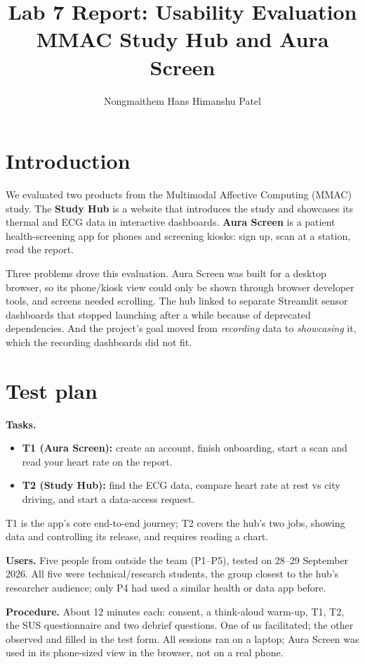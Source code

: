 \documentclass[10pt,a4paper,twocolumn]{article}
\title{\vspace{-1.2cm}\textbf{Lab 7 Report: Usability Evaluation}\\[2pt]
  \large MMAC Study Hub and Aura Screen}
\author{Nongmaithem Hans \quad Himanshu Patel}
\date{\vspace{-0.4cm}}
\begin{document}
\maketitle

\section{Introduction}
We evaluated two products from the Multimodal Affective Computing (MMAC) study.
The \textbf{Study Hub} is a website that introduces the study and showcases its
thermal and ECG data in interactive dashboards. \textbf{Aura Screen} is a patient
health-screening app for phones and screening kiosks: sign up, scan at a station,
read the report.

Three problems drove this evaluation. Aura Screen was built for a desktop browser,
so its phone/kiosk view could only be shown through browser developer tools, and
screens needed scrolling. The hub linked to separate Streamlit sensor dashboards
that stopped launching after a while because of deprecated dependencies. And the
project's goal moved from \emph{recording} data to \emph{showcasing} it, which the
recording dashboards did not fit.

\section{Test plan}
\textbf{Tasks.}
\begin{itemize}
  \item \textbf{T1 (Aura Screen):} create an account, finish onboarding,
    start a scan and read your heart rate on the report.
  \item \textbf{T2 (Study Hub):} find the ECG data, compare heart rate at rest
    vs city driving, and start a data-access request.
\end{itemize}
T1 is the app's core end-to-end journey; T2 covers the hub's two jobs, showing data
and controlling its release, and requires reading a chart.

\textbf{Users.} Five people from outside the team (P1--P5), tested on 28--29
September 2026. All five were technical/research students, the group closest to the
hub's researcher audience; only P4 had used a similar health or data app before.

\textbf{Procedure.} About 12 minutes each: consent, a think-aloud warm-up, T1, T2,
the SUS questionnaire and two debrief questions. One of us facilitated; the other
observed and filled in the test form. All sessions ran on a laptop; Aura Screen
was used in its phone-sized view in the browser, not on a real phone.
\end{document}
